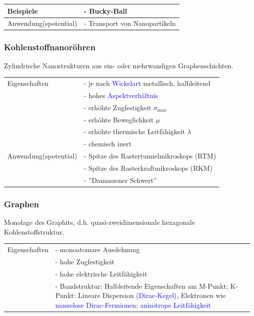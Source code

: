 \documentclass{article}
\begin{document}
\begin{table}[H]
	\centering
	\begin{tabularx}{0.75\textwidth}{|l|X|}
		\hline\hline
			Beispiele & - Bucky-Ball \\
		\hline
			Anwendung(spotential) & - Transport von Nanopartikeln\\
		\hline\hline
	\end{tabularx}
\end{table}


\subsubsection{Kohlenstoffnanoröhren}
Zylindrische Nanostrukturen aus ein- oder mehrwandigen Graphenschichten.

\begin{table}[H]
	\centering
	\begin{tabularx}{0.75\textwidth}{|l|X|}
		\hline\hline
			Eigenschaften & - je nach \textcolor{blue}{Wickelart} metallisch, halbleitend\\
			& - hohes \textcolor{blue}{Aspektverhältnis}\\
			& - erhöhte Zugfestigkeit $\sigma_{\text{max}}$ \\
			& - erhöhte Beweglichkeit $\mu$\\
			& - erhöhte thermische Leitfähigkeit $\lambda$\\
			& - chemisch inert\\
		\hline
			Anwendung(spotential) & - Spitze des Rastertunnelmikroskops (RTM)\\
			& - Spitze des Rasterkraftmikroskops (RKM)\\
			& - ''Damaszener Schwert''\\
		\hline\hline
	\end{tabularx}
\end{table}


\subsubsection{Graphen}
Monolage des Graphits, d.h. quasi-zweidimensionale hexagonale Kohlenstoffstruktur.

\begin{table}[H]
	\centering
	\begin{tabularx}{0.75\textwidth}{|l|X|}
		\hline\hline
			Eigenschaften & - monoatomare Ausdehnung\\
			& - hohe Zugfestigkeit\\
			& - hohe elektrische Leitfähigkeit\\
			& - Bandstruktur: Halbleitende Eigenschaften am M-Punkt; K-Punkt: Lineare Dispersion (\textcolor{blue}{Dirac-Kegel}), Elektronen wie \textcolor{blue}{masselose Dirac-Fermionen}; \textcolor{blue}{anisotrope Leitfähigkeit}\\
		\hline\hline
	\end{tabularx}
\end{table}
\end{document}
